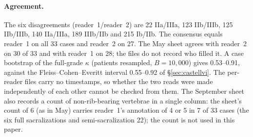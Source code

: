\paragraph{Agreement.}
The six disagreements (reader~1/reader~2) are 22 IIa/IIIa,
123 IIb/IIIb, 125 IIb/IIIb, 140 IIa/IIIa, 189 IIIb/IIb and
215 Ib/IIb. The consensus equals reader~1 on all 33 cases
and reader~2 on 27. The May sheet agrees with reader~2 on
30 of 33 and with reader~1 on 28; the files do not record
who filled it. A case bootstrap of the full-grade $\kappa$
(patients resampled, $B{=}10{,}000$) gives 0.53--0.91,
against the Fleiss--Cohen--Everitt interval 0.55--0.92 of
\S\ref{sec:castellvi}. The per-reader files carry no
timestamps, so whether the two reads were made
independently of each other cannot be checked from them.
The September sheet also records a count of
non-rib-bearing vertebrae in a single column: the sheet's
count of 6 (as in May) carries reader~1's annotation of 4
or 5 in 7 of 33 cases (the six full sacralizations and
semi-sacralization 22); the count is not used in this
paper.
